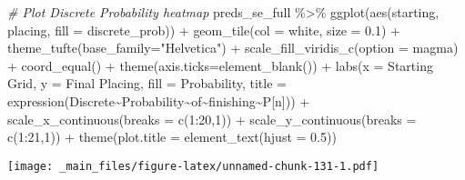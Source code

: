 \documentclass[
]{book}
\newenvironment{Shaded}{\begin{snugshade}}{\end{snugshade}}
\newcommand{\AttributeTok}[1]{\textcolor[rgb]{0.77,0.63,0.00}{#1}}
\newcommand{\CommentTok}[1]{\textcolor[rgb]{0.56,0.35,0.01}{\textit{#1}}}
\newcommand{\DecValTok}[1]{\textcolor[rgb]{0.00,0.00,0.81}{#1}}
\newcommand{\FloatTok}[1]{\textcolor[rgb]{0.00,0.00,0.81}{#1}}
\newcommand{\FunctionTok}[1]{\textcolor[rgb]{0.00,0.00,0.00}{#1}}
\newcommand{\NormalTok}[1]{#1}
\newcommand{\SpecialCharTok}[1]{\textcolor[rgb]{0.00,0.00,0.00}{#1}}
\newcommand{\StringTok}[1]{\textcolor[rgb]{0.31,0.60,0.02}{#1}}
\begin{document}
\begin{Shaded}
\begin{Highlighting}[]
\CommentTok{\# Plot Discrete Probability heatmap}
\NormalTok{preds\_se\_full }\SpecialCharTok{\%\textgreater{}\%}
  \FunctionTok{ggplot}\NormalTok{(}\FunctionTok{aes}\NormalTok{(starting, placing, }\AttributeTok{fill =}\NormalTok{ discrete\_prob)) }\SpecialCharTok{+}
  \FunctionTok{geom\_tile}\NormalTok{(}\AttributeTok{col =} \StringTok{\textquotesingle{}white\textquotesingle{}}\NormalTok{, }\AttributeTok{size =} \FloatTok{0.1}\NormalTok{) }\SpecialCharTok{+}
  \FunctionTok{theme\_tufte}\NormalTok{(}\AttributeTok{base\_family=}\StringTok{"Helvetica"}\NormalTok{) }\SpecialCharTok{+}
  \FunctionTok{scale\_fill\_viridis\_c}\NormalTok{(}\AttributeTok{option =} \StringTok{\textquotesingle{}magma\textquotesingle{}}\NormalTok{) }\SpecialCharTok{+}
  \FunctionTok{coord\_equal}\NormalTok{() }\SpecialCharTok{+}
  \FunctionTok{theme}\NormalTok{(}\AttributeTok{axis.ticks=}\FunctionTok{element\_blank}\NormalTok{()) }\SpecialCharTok{+}
  \FunctionTok{labs}\NormalTok{(}\AttributeTok{x =} \StringTok{\textquotesingle{}Starting Grid\textquotesingle{}}\NormalTok{,}
       \AttributeTok{y =} \StringTok{\textquotesingle{}Final Placing\textquotesingle{}}\NormalTok{,}
       \AttributeTok{fill =} \StringTok{\textquotesingle{}Probability\textquotesingle{}}\NormalTok{,}
       \AttributeTok{title =} \FunctionTok{expression}\NormalTok{(Discrete}\SpecialCharTok{\textasciitilde{}}\NormalTok{Probability}\SpecialCharTok{\textasciitilde{}}\NormalTok{of}\SpecialCharTok{\textasciitilde{}}\NormalTok{finishing}\SpecialCharTok{\textasciitilde{}}\NormalTok{P[n])) }\SpecialCharTok{+}
  \FunctionTok{scale\_x\_continuous}\NormalTok{(}\AttributeTok{breaks =} \FunctionTok{c}\NormalTok{(}\DecValTok{1}\SpecialCharTok{:}\DecValTok{20}\NormalTok{,}\DecValTok{1}\NormalTok{)) }\SpecialCharTok{+}
  \FunctionTok{scale\_y\_continuous}\NormalTok{(}\AttributeTok{breaks =} \FunctionTok{c}\NormalTok{(}\DecValTok{1}\SpecialCharTok{:}\DecValTok{21}\NormalTok{,}\DecValTok{1}\NormalTok{)) }\SpecialCharTok{+}
  \FunctionTok{theme}\NormalTok{(}\AttributeTok{plot.title =} \FunctionTok{element\_text}\NormalTok{(}\AttributeTok{hjust =} \FloatTok{0.5}\NormalTok{))}
\end{Highlighting}
\end{Shaded}

\texttt{[image: \_main\_files/figure-latex/unnamed-chunk-131-1.pdf]}
\end{document}
